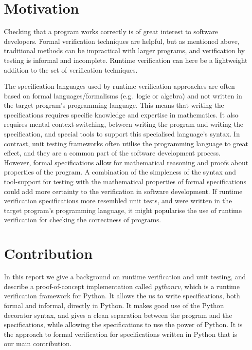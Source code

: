 \section{Motivation}

Checking that a program works correctly is of great interest to software
developers. Formal verification techniques are helpful, but as mentioned above,
traditional methods can be impractical with larger programs, and verification
by testing is informal and incomplete. Runtime verification can here be a
lightweight addition to the set of verification techniques.

The specification languages used by runtime verification approaches are often
based on formal languages/formalisms (e.g.\ logic or algebra) and not written
in the target program's programming language. This means that writing the
specifications requires specific knowledge and expertise in mathematics. It
also requires mental context-switching, between writing the program and writing
the specification, and special tools to support this specialised language's
syntax. In contrast, unit testing frameworks often utilise the programming
language to great effect, and they are a common part of the software
development process. However, formal specifications allow for mathematical
reasoning and proofs about properties of the program. A combination of the
simpleness of the syntax and tool-support for testing with the mathematical
properties of formal specifications could add more certainty to the
verification in software development. If runtime verification specifications
more resembled unit tests, and were written in the target program's programming
language, it might popularise the use of runtime verification for checking the
correctness of programs.


\section{Contribution}

In this report we give a background on runtime verification and unit testing,
and describe a proof-of-concept implementation called \textit{pythonrv}, which
is a runtime verification framework for Python. It allows the us to write
specifications, both formal and informal, directly in Python. It makes good use
of the Python decorator syntax, and gives a clean separation between the
program and the specifications, while allowing the specifications to use the
power of Python. It is the approach to formal verification for specifications
written in Python that is our main contribution.

